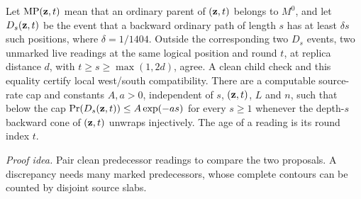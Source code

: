 \begin{lemma}\label{c:coherence}
Let \(\mathrm{MP}({\bf z},t)\) mean that an ordinary parent of \(({\bf z},t)\)
belongs to \(M^0\), and let \(D_s({\bf z},t)\) be the event that a backward
ordinary path of length \(s\) has at least \(\delta s\) such positions,
where \(\delta=1/1404\). Outside the corresponding two \(D_s\) events,
two unmarked live readings at the same logical position and round \(t\),
at replica distance \(d\), with \(t\ge s\ge\max(1,2d)\), agree. A clean
child check and this equality certify local west/south compatibility.
There are a computable source-rate cap and constants \(A,a>0\),
independent of \(s\), \(({\bf z},t)\), \(L\) and \(n\), such that below
the cap \(\Pr(D_s({\bf z},t))\le A\exp(-as)\) for every \(s\ge1\)
whenever the depth-\(s\) backward cone of \(({\bf z},t)\) unwraps
injectively. The age of a reading is its round index \(t\).
\end{lemma}
\par\noindent\emph{Proof idea.} Pair clean predecessor readings to compare the two proposals. A discrepancy needs many marked predecessors, whose complete contours can be counted by disjoint source slabs.

